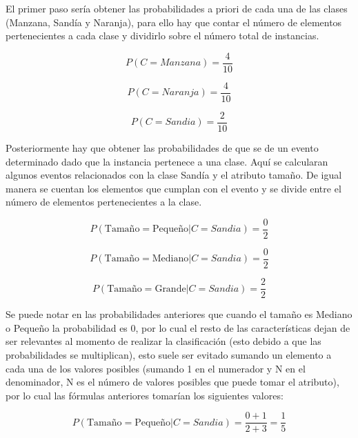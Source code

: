 \documentclass[11pt,fleqn]{book} %
\begin{document}
El primer paso sería obtener las probabilidades a priori de cada una de las clases (Manzana, Sandía y Naranja), para ello hay que contar el número de elementos pertenecientes a cada clase y dividirlo sobre el número total de instancias.

\begin{equation}
P(C=Manzana) = \frac{4}{10}
\label{eqn:prioriManzana} 
\end{equation}

\begin{equation}
P(C=Naranja) = \frac{4}{10}
\label{eqn:prioriNaranja} 
\end{equation}

\begin{equation}
P(C=Sandia) = \frac{2}{10}
\label{eqn:prioriSandia} 
\end{equation}

Posteriormente hay que obtener las probabilidades de que se de un evento determinado dado que la instancia pertenece a una clase. Aquí se calcularan algunos eventos relacionados con la clase Sandía y el atributo tamaño.
De igual manera se cuentan los elementos que cumplan con el evento y se divide entre el número de elementos pertenecientes a la clase.

\begin{equation}
P(\text{Tamaño}=\text{Pequeño} | C=Sandia) = \frac{0}{2}
\label{eqn:tamPeqSandia} 
\end{equation}

\begin{equation}
P(\text{Tamaño}=\text{Mediano} | C=Sandia) = \frac{0}{2}
\label{eqn:tamMedSandia} 
\end{equation}

\begin{equation}
P(\text{Tamaño}=\text{Grande} | C=Sandia) = \frac{2}{2}
\label{eqn:tamGraSandia} 
\end{equation}

Se puede notar en las probabilidades anteriores que cuando el tamaño es Mediano o Pequeño la probabilidad es 0, por lo cual el resto de las características dejan de ser relevantes al momento de realizar la clasificación (esto debido a que las probabilidades se multiplican), esto suele ser evitado sumando un elemento a cada una de los valores posibles (sumando 1 en el numerador y N en el denominador, N es el número de valores posibles que puede tomar el atributo), por lo cual las fórmulas anteriores tomarían los siguientes valores:

\begin{equation}
P(\text{Tamaño}=\text{Pequeño} | C=Sandia) = \frac{0+1}{2+3} = \frac{1}{5}
\label{eqn:tamPeqSandia2} 
\end{equation}
\end{document}
